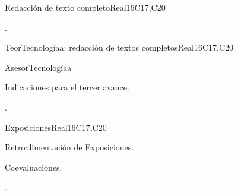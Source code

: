 \begin{syllabus}
\begin{unit}{Redacción de texto completo}{}{Real}{16}{C17,C20}
  \begin{learningoutcomes}
   \item .%
  \end{learningoutcomes}
\end{unit}

\begin{unit}{TeorTecnologíaa: redacción de textos completos}{}{Real}{16}{C17,C20}
  \begin{topics}
      \item AsesorTecnologíaa
      \item Indicaciones para el tercer avance.
  \end{topics}

  \begin{learningoutcomes}
   \item .%
  \end{learningoutcomes}
\end{unit}

\begin{unit}{Exposiciones}{}{Real}{16}{C17,C20}
  \begin{topics}
      \item Retroalimentación de Exposiciones.
      \item Coevaluaciones.
  \end{topics}

  \begin{learningoutcomes}
   \item .%
  \end{learningoutcomes}
\end{unit}



\begin{coursebibliography}
\end{coursebibliography}

\end{syllabus}
